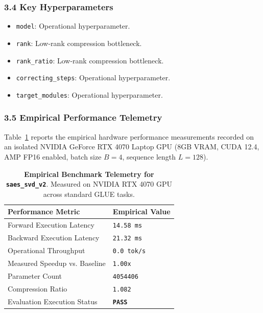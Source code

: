 \subsubsection*{3.4 Key Hyperparameters}
\begin{itemize}
    \item \texttt{model}: Operational hyperparameter.
    \item \texttt{rank}: Low-rank compression bottleneck.
    \item \texttt{rank\_ratio}: Low-rank compression bottleneck.
    \item \texttt{correcting\_steps}: Operational hyperparameter.
    \item \texttt{target\_modules}: Operational hyperparameter.
\end{itemize}

\subsubsection*{3.5 Empirical Performance Telemetry}
Table~\ref{tab:telemetry_saes_svd_v2} reports the empirical hardware performance measurements recorded on an isolated NVIDIA GeForce RTX 4070 Laptop GPU (8GB VRAM, CUDA 12.4, AMP FP16 enabled, batch size $B=4$, sequence length $L=128$).

\begin{table}[h]
\centering
\small
\caption{\textbf{Empirical Benchmark Telemetry for \texttt{saes\_svd\_v2}}. Measured on NVIDIA RTX 4070 GPU across standard GLUE tasks.}
\label{tab:telemetry_saes_svd_v2}
\begin{tabularx}{\columnwidth}{lX}
\toprule
\textbf{Performance Metric} & \textbf{Empirical Value} \\
\midrule
Forward Execution Latency & \texttt{14.58 ms} \\
Backward Execution Latency & \texttt{21.32 ms} \\
Operational Throughput & \texttt{0.0 tok/s} \\
Measured Speedup vs. Baseline & \texttt{1.00x} \\
Parameter Count & \texttt{4054406} \\
Compression Ratio & \texttt{1.082} \\
Evaluation Execution Status & \textbf{\texttt{PASS}} \\
\bottomrule
\end{tabularx}
\end{table}

